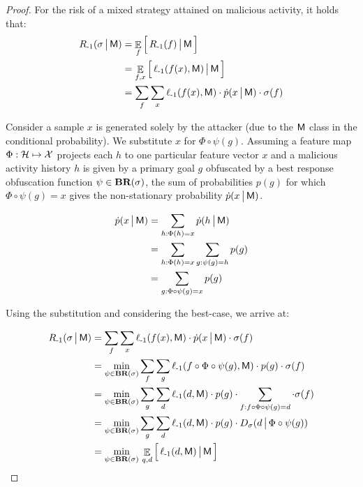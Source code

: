\begin{proof}

For the risk of a mixed strategy attained on malicious activity, it holds that:
\begin{align}
    R_{{\text{-}1}}(\sigma \,\big|\, \mathsf{M}) &= \mathop{\mathbb{E}}_f \Big[\, R_{{\text{-}1}}(f) \,\big|\, \mathsf{M} \,\Big] \\
    &= \mathop{\mathbb{E}}_{f, x} \Big[\, \ell_{{\text{-}1}}(f(x), \mathsf{M}) \,\big|\, \mathsf{M} \,\Big] \\
    &= \sum_f \sum_x \ell_{{\text{-}1}}(f(x), \mathsf{M})  \cdot  \dot{p}(x \,\big|\, \mathsf{M})  \cdot  \sigma(f)
\end{align}

Consider a sample $x$ is generated solely by the attacker (due to the $\mathsf{M}$ class in the conditional probability). We substitute $x$ for $\Phi \circ \psi (g)$. Assuming a feature map $\Phi: \mathcal{H} \mapsto \mathcal{X}$ projects each $h$ to one particular feature vector $x$ and a malicious activity history $h$ is  given by a primary goal $g$ obfuscated by a best response obfuscation function $\psi \in \textbf{BR}(\sigma)$, the sum of probabilities $p(g)$ for which $\Phi \circ \psi(g) = x$ gives the non-stationary probability $\dot{p} (x \,\big|\, \mathsf{M})$.

\begin{align}
    \dot{p} (x \,\big|\, \mathsf{M}) &= \sum_{h: \Phi(h) = x} \dot{p}(h \,\big|\, \mathsf{M}) \\
    &= \sum_{h: \Phi(h) = x} \sum_{g: \psi(g) = h} p(g) \\
    &= \sum_{g: \Phi \circ \psi(g) = x} p(g)
\end{align}

Using the substitution and considering the best-case, we arrive at:

\begin{align}
    R_{{\text{-}1}}(\sigma \,\big|\, \mathsf{M}) &= \sum_f \sum_x \ell_{{\text{-}1}}(f(x), \mathsf{M})  \cdot  \dot{p}(x \,\big|\, \mathsf{M})  \cdot  \sigma(f) \\
    &= \min_{\psi \in \textbf{BR}(\sigma)}
        \sum_f \sum_g \ell_{{\text{-}1}}(f \circ \Phi \circ \psi(g), \mathsf{M})  \cdot p(g)  \cdot \sigma(f) \\
    &= \min_{\psi \in \textbf{BR}(\sigma)}
        \sum_g \sum_d \ell_{{\text{-}1}}(d, \mathsf{M}) \cdot p(g)  \cdot \sum_{f: f \circ \Phi \circ \psi(g) = d} \cdot \sigma(f) \\
    &= \min_{\psi \in \textbf{BR}(\sigma)}
        \sum_g \sum_d \ell_{{\text{-}1}}(d, \mathsf{M}) \cdot p(g) \cdot D_\sigma(d \,\big|\, \Phi \circ \psi(g)) \\
    &= \min_{\psi \in \textbf{BR}(\sigma) } \,
        \mathop{\mathbb{E}}_{q, d} \Big[\, \ell_{{\text{-}1}} (d, \mathsf{M}) \,\big|\, \mathsf{M} \,\Big]
\end{align}


\end{proof}
